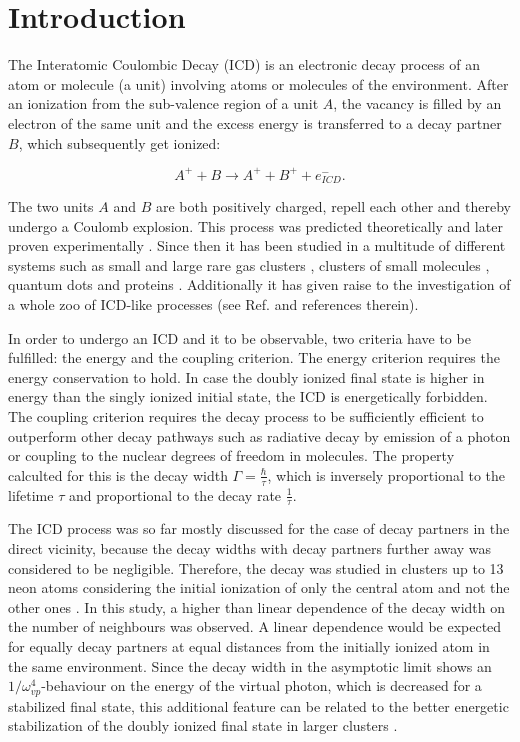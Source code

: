 \section{Introduction}

The Interatomic Coulombic Decay (ICD) is an electronic decay process of an atom or
molecule (a unit) involving atoms or molecules of the environment. After an
ionization from the sub-valence region of a unit $A$, the vacancy is filled
by an electron of the same unit and the excess energy is transferred to a decay
partner $B$, which subsequently get ionized:

\begin{equation*}
 A^+ + B \rightarrow A^+ + B^+ + e^-_{ICD}  .
\end{equation*}

The two units $A$ and $B$ are both positively charged, repell each other and
thereby undergo a Coulomb explosion. This process was predicted theoretically
\cite{Cederbaum97} and later proven experimentally \cite{Marburger03}. Since then
it has been studied in a multitude of different systems such as small and large
rare gas clusters \cite{many,Fasshauer14_1},
clusters of small molecules \cite{},
quantum dots \cite{Bande13}
and proteins \cite{Harbach13}. Additionally it has given raise to
the investigation of a whole zoo of ICD-like processes (see Ref. \cite{}
and references therein).

In order to undergo an ICD and it to be observable, two criteria have to
be fulfilled: the energy and the coupling criterion. The energy criterion
requires the energy conservation to hold. In case the doubly ionized final
state is higher in energy than the singly ionized initial state, the ICD
is energetically forbidden. The coupling criterion requires the decay
process to be sufficiently efficient to outperform other decay pathways
such as radiative decay by emission of a photon or coupling to the nuclear
degrees of freedom in molecules. The property calculted for this is the
decay width $\Gamma = \frac{\hbar}{\tau}$, which is inversely proportional
to the lifetime $\tau$ and proportional to the decay rate $\frac{1}{\tau}$.

The ICD process was so far mostly discussed for the case of decay partners in
the direct vicinity, because the decay widths with decay partners further away
was considered to be negligible. Therefore, the decay was studied in clusters
up to 13 neon atoms considering the initial ionization of only the central
atom and not the other ones \cite{Santra01_3}. In this study, a higher than
linear dependence of the decay width on the number of neighbours was
observed. A linear dependence would be expected for equally decay partners
at equal distances from the initially ionized atom in the same environment.
Since the decay width in the asymptotic limit shows an 
$1/\omega^{4}_{vp}$-behaviour on the energy of the virtual photon, which
is decreased for a stabilized final state, this additional feature
can be related to
the better energetic stabilization of the doubly ionized
final state in larger clusters \cite{Fasshauer13}.

